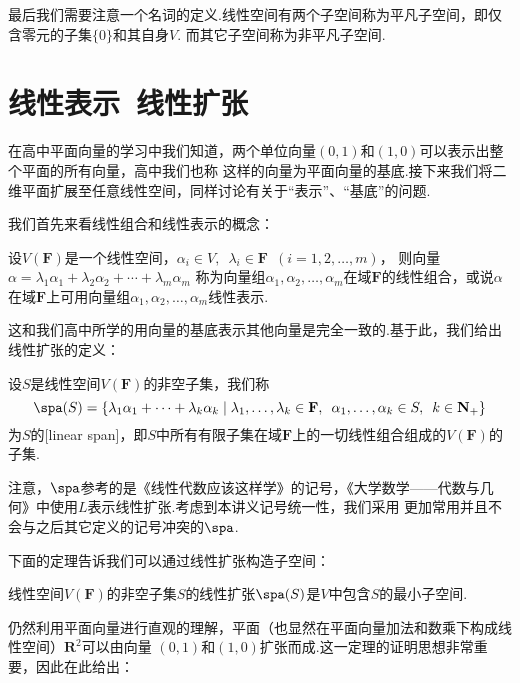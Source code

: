 最后我们需要注意一个名词的定义.线性空间有两个子空间称为平凡子空间，即仅含零元的子集$\{0\}$和其自身$V$.
而其它子空间称为非平凡子空间.

\section{线性表示\ 线性扩张}
在高中平面向量的学习中我们知道，两个单位向量$(0,1)$和$(1,0)$可以表示出整个平面的所有向量，高中我们也称
这样的向量为平面向量的基底.接下来我们将二维平面扩展至任意线性空间，同样讨论有关于``表示''、``基底''的问题.

我们首先来看线性组合和线性表示的概念：
\begin{definition}
    设$V(\mathbf{F})$是一个线性空间，$\alpha_i\in V,\enspace\lambda_i\in \mathbf{F}\enspace(i=1,2,\ldots,m)$，
    则向量$\alpha=\lambda_1\alpha_1+\lambda_2\alpha_2+\cdots+\lambda_m\alpha_m$
    称为向量组$\alpha_1,\alpha_2,\ldots,\alpha_m$在域$\mathbf{F}$的线性组合，或说$\alpha$
    在域$\mathbf{F}$上可用向量组$\alpha_1,\alpha_2,\ldots,\alpha_m$线性表示.
\end{definition}
这和我们高中所学的用向量的基底表示其他向量是完全一致的.基于此，我们给出线性扩张的定义：
\begin{definition}
    设$S$是线性空间$V(\mathbf{F})$的非空子集，我们称
    \[ \spa(S)=\{\lambda_1\alpha_1+\cdots+\lambda_k\alpha_k \mid \lambda_1,\ldots,\lambda_k\in\mathbf{F},\enspace\alpha_1,\ldots,\alpha_k\in S,\enspace k\in\mathbf{N_+}\} \]
    为$S$的[linear span]，即$S$中所有有限子集在域$\mathbf{F}$上的一切线性组合组成的$V(\mathbf{F})$的子集.
\end{definition}
注意，$\spa$参考的是《线性代数应该这样学》的记号，《大学数学——代数与几何》中使用$L$表示线性扩张.考虑到本讲义记号统一性，我们采用
更加常用并且不会与之后其它定义的记号冲突的$\spa$.

下面的定理告诉我们可以通过线性扩张构造子空间：
\begin{theorem}
    线性空间$V(\mathbf{F})$的非空子集$S$的线性扩张$\spa(S)$是$V$中包含$S$的最小子空间.
\end{theorem}
仍然利用平面向量进行直观的理解，平面（也显然在平面向量加法和数乘下构成线性空间）$\mathbf{R}^2$可以由向量
$(0,1)$和$(1,0)$扩张而成.这一定理的证明思想非常重要，因此在此给出：

